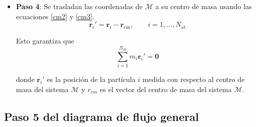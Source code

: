 \begin{itemize}
		
		\item \textbf{Paso 4}: Se trasladan las coordenadas de $\mathcal{M}$ a su centro de masa usando las ecuaciones \ref{cm2} y \ref{cm3}.
		\begin{equation}
			\mathbf{r}_i' = \mathbf{r}_i - \mathbf{r}_{\text{cm}}, \qquad
			i=1,\dots,N_{\text{at}}
			\label{cm2}
		\end{equation}
		
		Esto garantiza que
		\begin{equation}
			\sum_{i=1}^{N_{\text{at}}} m_i \mathbf{r}_i' = \mathbf{0}
			\label{cm3}
		\end{equation} 
		
		donde $\mathbf{r}_i'$ es la posición de la partícula $i$ medida 
		con respecto al centro de masa del sistema $\mathcal{M}$ y 
		$r_{cm}$ es el vector del centro de masa del sistema $\mathcal{M}$.
		
		
	\end{itemize}


	\subsection{Paso 5 del diagrama de flujo general}
	
